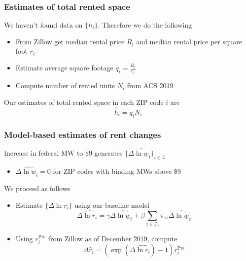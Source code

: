 \documentclass[aspectratio=169, t]{beamer}
\newcommand{\Z}{\mathcal{Z}}
\newcommand{\MW}{\underline{w}}
\begin{document}
\begin{frame}
    \frametitle{Estimates of total rented space}
       
    We haven't found data on $\{h_i\}$. Therefore we do the following
    
    \begin{itemize}
    	\vspace{1mm}
        \item From Zillow get median rental price $R_i$ and median rental price per square foot $r_i$
        \vspace{1mm}
        \item Estimate average square footage $q_i = \frac{R_i}{r_i}$
        \vspace{1mm}
        \item Compute number of rented units $N_i$ from ACS 2019
    \end{itemize}
    
    \pause
    \vspace{3mm}
    Our estimates of total rented space in each ZIP code $i$ are
    \[
    \hat h_i = q_i N_i
    \]
\end{frame}

\begin{frame}
    \frametitle{Model-based estimates of rent changes}
    
    Increase in federal MW to \$9 generates $\{\Delta \hat{\ln \MW}_i\}_{i\in\Z}$
    \begin{itemize}
    	\item $\Delta \hat{\ln \MW}_i=0$ for ZIP codes with binding MWs above \$9
    \end{itemize}
    
    \pause
	\vspace{3mm}
	We proceed as follows
	\vspace{1mm}
	\begin{itemize}
		\item Estimate $\{\Delta \ln r_i\}$ using our baseline model
		\begin{equation*}
			\Delta \hat{\ln r_i} = \gamma \Delta \hat{\ln \MW}_i + \beta \sum_{z\in\Z_i} \pi_{iz} \Delta \hat{\ln \MW}_z
		\end{equation*}
		\item Using $r^{\text{Pre}}_i$ from Zillow as of December 2019, compute 
		$$\Delta \hat r_i = \left(\exp(\Delta \hat{\ln r_i}) - 1 \right) r_i^{\text{Pre}}$$
	\end{itemize}

\end{frame}
\end{document}
